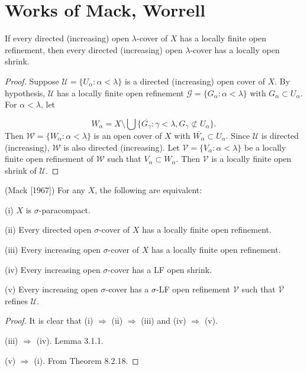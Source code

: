 \documentclass[main.tex]{subfiles}
\begin{document}
\section{Works of Mack, Worrell}\label{ch3_mack_worrell}

{\lemma{} If every directed (increasing) open $\lambda$-cover of $X$ has a locally finite 
	open refinement, then every directed (increasing) open $\lambda$-cover has a 
	locally open shrink.
}
\begin{proof}
Suppose $\mathscr{U} = \{U_\alpha : \alpha < \lambda\}$ is a directed (increasing) open cover of $X$. By hypothesis, $\mathscr{U}$ has a locally finite open refinement $\mathscr{G} = \{G_\alpha : \alpha < \lambda\}$ with $G_\alpha \subset U_\alpha$. 
For $\alpha < \lambda$, let

$$W_\alpha = X \setminus \bigcup \{ \overline{G_\gamma} : \gamma < \lambda,  
G_\gamma \not\subset U_\alpha\}.$$
Then $\mathscr{W} = \{W_\alpha : \alpha < \lambda\}$ is an open cover of $X$ 
with $\overline{W_\alpha} \subset U_\alpha$. 
Since $\mathscr{U}$ is directed (increasing), $\mathscr{W}$ is also 
directed (increasing). Let $\mathscr{V} = \{V_\alpha : \alpha < \lambda\}$ be  a locally finite open refinement of $\mathscr{W}$ such that $V_\alpha \subset W_\alpha$. Then $\mathscr{V}$ is a locally finite open shrink of $\mathscr{U}$. 
\end{proof} 

{\theorem{} \textup{(Mack [1967])} For any $X$, the following are equivalent:

\textup{(i)} $X$ is $\sigma$-paracompact.

\textup{(ii)} Every directed open $\sigma$-cover of $X$ has a  locally finite open refinement.

\textup{(iii)} Every increasing open $\sigma$-cover of $X$ has a  locally finite open refinement.

\textup{(iv)}  Every increasing open $\sigma$-cover has a LF open shrink.

\textup{(v)}  Every increasing open $\sigma$-cover has a $\sigma$-LF open refinement $\mathscr{V}$ such that $\overline{\mathscr{V}}$ refines $\mathscr{U}$.
}

\begin{proof}
It is clear that (i) $\Rightarrow$ (ii) $\Rightarrow$ (iii) and (iv) $\Rightarrow$ (v).

(iii) $\Rightarrow$ (iv). Lemma 3.1.1.

(v) $\Rightarrow$ (i). From Theorem 8.2.18. %
\end{proof} 
\end{document}
